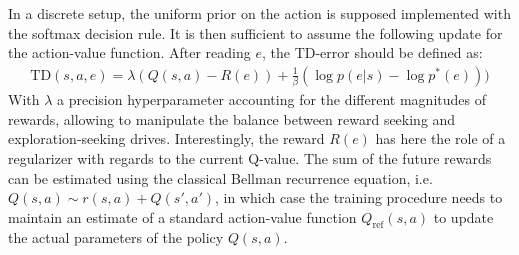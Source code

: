 \documentclass[runningheads]{llncs}
\begin{document}

In a discrete setup, the uniform prior on the action is supposed implemented with the softmax decision rule. It is then sufficient to assume the following update for the action-value function.
After reading $e$, %
the TD-error should be defined as:
\begin{align}\label{eq:var-RL-lambda}
\text{TD}(s,a,e) = \lambda(Q(s,a) - R(e)) + \frac{1}{\beta} (\log p(e|s) - \log p^*(e)))
\end{align}
With $\lambda$ a precision hyperparameter accounting for the different magnitudes of rewards, allowing to manipulate the balance between reward seeking and exploration-seeking drives.
Interestingly, the reward $R(e)$ has here the role of a regularizer with regards to the current Q-value. The sum of the future rewards can be estimated using the classical Bellman recurrence equation, i.e. $Q(s,a) \sim r(s,a) + Q(s', a')$, in which case the training procedure needs to maintain an estimate of a standard action-value function $Q_\text{ref}(s,a)$ to update the actual parameters of the policy $Q(s,a)$.  








\end{document}

